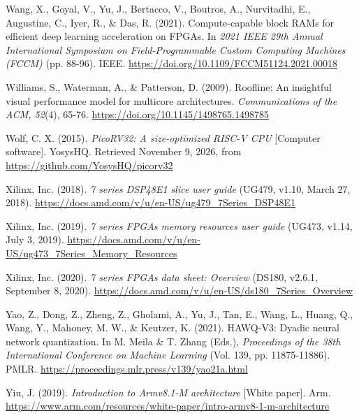 \begin{apareferences}
Wang, X., Goyal, V., Yu, J., Bertacco, V., Boutros, A., Nurvitadhi, E., Augustine, C., Iyer, R., \& Das, R. (2021). Compute-capable block RAMs for efficient deep learning acceleration on FPGAs. In \emph{2021 IEEE 29th Annual International Symposium on Field-Programmable Custom Computing Machines (FCCM)} (pp. 88-96). IEEE. \url{https://doi.org/10.1109/FCCM51124.2021.00018}

Williams, S., Waterman, A., \& Patterson, D. (2009). Roofline: An insightful visual performance model for multicore architectures. \emph{Communications of the ACM, 52}(4), 65-76. \url{https://doi.org/10.1145/1498765.1498785}

Wolf, C. X. (2015). \emph{PicoRV32: A size-optimized RISC-V CPU} {[}Computer software{]}. YosysHQ. Retrieved November 9, 2026, from \url{https://github.com/YosysHQ/picorv32}

Xilinx, Inc. (2018). \emph{7 series DSP48E1 slice user guide} (UG479, v1.10, March 27, 2018). \url{https://docs.amd.com/v/u/en-US/ug479_7Series_DSP48E1}

Xilinx, Inc. (2019). \emph{7 series FPGAs memory resources user guide} (UG473, v1.14, July 3, 2019). \url{https://docs.amd.com/v/u/en-US/ug473_7Series_Memory_Resources}

Xilinx, Inc. (2020). \emph{7 series FPGAs data sheet: Overview} (DS180, v2.6.1, September 8, 2020). \url{https://docs.amd.com/v/u/en-US/ds180_7Series_Overview}

Yao, Z., Dong, Z., Zheng, Z., Gholami, A., Yu, J., Tan, E., Wang, L., Huang, Q., Wang, Y., Mahoney, M. W., \& Keutzer, K. (2021). HAWQ-V3: Dyadic neural network quantization. In M. Meila \& T. Zhang (Eds.), \emph{Proceedings of the 38th International Conference on Machine Learning} (Vol. 139, pp. 11875-11886). PMLR. \url{https://proceedings.mlr.press/v139/yao21a.html}

Yiu, J. (2019). \emph{Introduction to Armv8.1-M architecture} {[}White paper{]}. Arm. \url{https://www.arm.com/resources/white-paper/intro-armv8-1-m-architecture}

\end{apareferences}
